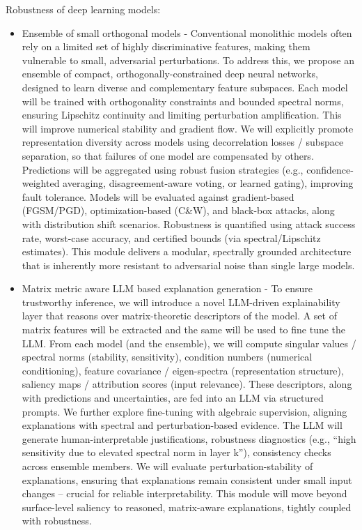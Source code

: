 \documentclass[a4paper,11pt]{article}
\begin{document}
Robustness of deep learning models:
\begin{itemize}
	\item Ensemble of small orthogonal models - Conventional monolithic models often rely on a limited set of highly discriminative features, making them vulnerable to small, adversarial perturbations. To address this, we propose an ensemble of compact, orthogonally-constrained deep neural networks, designed to learn diverse and complementary feature subspaces. Each model will be trained with orthogonality constraints and bounded spectral norms, ensuring Lipschitz continuity and limiting perturbation amplification. This will improve numerical stability and gradient flow. We will explicitly promote representation diversity across models using decorrelation losses / subspace separation, so that failures of one model are compensated by others. Predictions will be aggregated using robust fusion strategies (e.g., confidence-weighted averaging, disagreement-aware voting, or learned gating), improving fault tolerance. Models will be evaluated against gradient-based (FGSM/PGD), optimization-based (C\&W), and black-box attacks, along with distribution shift scenarios. Robustness is quantified using attack success rate, worst-case accuracy, and certified bounds (via spectral/Lipschitz estimates). This module delivers a modular, spectrally grounded architecture that is inherently more resistant to adversarial noise than single large models.
	
	\item Matrix metric aware LLM based explanation generation - To ensure trustworthy inference, we will introduce a novel LLM-driven explainability layer that reasons over matrix-theoretic descriptors of the model. A set of matrix features will be extracted and the same will be used to fine tune the LLM. From each model (and the ensemble), we will compute singular values / spectral norms (stability, sensitivity), condition numbers (numerical conditioning), feature covariance / eigen-spectra (representation structure), saliency maps / attribution scores (input relevance). These descriptors, along with predictions and uncertainties, are fed into an LLM via structured prompts. We further explore fine-tuning with algebraic supervision, aligning explanations with spectral and perturbation-based evidence. The LLM will generate human-interpretable justifications, robustness diagnostics (e.g., “high sensitivity due to elevated spectral norm in layer k”), consistency checks across ensemble members. We will evaluate perturbation-stability of explanations, ensuring that explanations remain consistent under small input changes -- crucial for reliable interpretability. This module will move beyond surface-level saliency to reasoned, matrix-aware explanations, tightly coupled with robustness.
	

\end{itemize}
\end{document}
